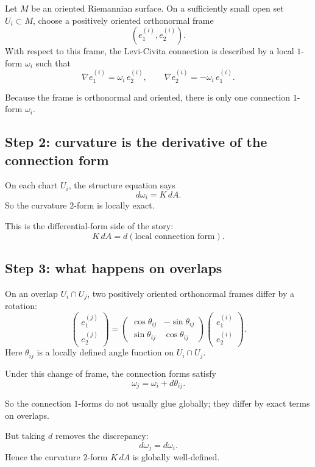 \documentclass[11pt]{article}
\begin{document}
	Let \(M\) be an oriented Riemannian surface. On a sufficiently small open set \(U_i\subset M\), choose a positively oriented orthonormal frame
	\[
	(e_1^{(i)},e_2^{(i)}).
	\]
	With respect to this frame, the Levi-Civita connection is described by a local \(1\)-form \(\omega_i\) such that
	\[
	\nabla e_1^{(i)}=\omega_i\, e_2^{(i)},
	\qquad
	\nabla e_2^{(i)}=-\omega_i\, e_1^{(i)}.
	\]
	
	Because the frame is orthonormal and oriented, there is only one connection \(1\)-form \(\omega_i\).
	
	\subsection*{Step 2: curvature is the derivative of the connection form}
	
	On each chart \(U_i\), the structure equation says
	\[
	d\omega_i = K\,dA.
	\]
	So the curvature \(2\)-form is locally exact.
	
	This is the differential-form side of the story:
	\[
	K\,dA = d(\text{local connection form}).
	\]
	
	\subsection*{Step 3: what happens on overlaps}
	
	On an overlap \(U_i\cap U_j\), two positively oriented orthonormal frames differ by a rotation:
	\[
	\begin{pmatrix}
		e_1^{(j)}\\
		e_2^{(j)}
	\end{pmatrix}
	=
	\begin{pmatrix}
		\cos\theta_{ij} & -\sin\theta_{ij}\\
		\sin\theta_{ij} & \cos\theta_{ij}
	\end{pmatrix}
	\begin{pmatrix}
		e_1^{(i)}\\
		e_2^{(i)}
	\end{pmatrix}.
	\]
	Here \(\theta_{ij}\) is a locally defined angle function on \(U_i\cap U_j\).
	
	Under this change of frame, the connection forms satisfy
	\[
	\omega_j = \omega_i + d\theta_{ij}.
	\]
	
	So the connection \(1\)-forms do not usually glue globally; they differ by exact terms on overlaps.
	
	But taking \(d\) removes the discrepancy:
	\[
	d\omega_j = d\omega_i.
	\]
	Hence the curvature \(2\)-form \(K\,dA\) is globally well-defined.
	
\end{document}
